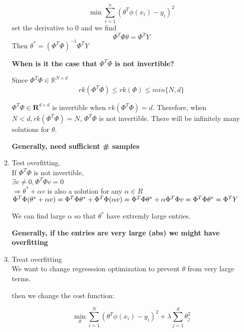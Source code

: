 \documentclass[12pt]{article}
\newcommand{\Rb}{\mathbf{R}}
\begin{document}
\begin{multicols}{2}
\begin{enumerate}
            $$\min \sum_{i = 1}^n (\theta^T \phi(x_i) - y_i)^2$$ set the derivative to 0 and we find $$\Phi^T \Phi \theta = \Phi^T Y$$ Then $\theta^* = (\Phi^T \Phi)^{-1}\Phi^T Y$

            \textbf{When is it the case that $\Phi^T\Phi$ is not invertible?}
            
            Since $\Phi^T \Phi \in \mathbb{R}^{N\times d}$ 
            $$rk(\Phi^T \Phi) \le rk(\Phi) \le min\{N,d\}$$

            $\Phi^T \Phi \in \Rb^{d \times d}$ is invertible when $rk(\Phi^T \Phi) = d$. Therefore, when $N < d, rk(\Phi^T \Phi) = N$, $\Phi^T \Phi $ is not invertible. There will be infinitely many solutions for $\theta$.

            \textbf{Generally, need sufficient \# samples}

            \item Test overfitting.\\
            If $\Phi^T \Phi$ is not invertible,\\
            $\exists v \ne 0 , \Phi^T \Phi v = 0$\\
            $\Rightarrow \theta^* + \alpha v$ is also a solution for any $\alpha \in R$\\
            $\Phi^T \Phi (\theta^* + \alpha v) = \Phi^T \Phi \theta^* + \Phi^T \Phi (\alpha v) \\ = \Phi^T \Phi \theta^* + \alpha \Phi^T \Phi v \\ = \Phi^T \Phi \theta^* = \Phi^T Y$

            We can find large $\alpha$ so that $\theta^*$ have extremly large entries.

            \textbf{Generally, if the entries are very large (abs) we might have overfitting}

            \item Treat overfitting\\
            We want to change regreession optimization to prevent $\theta$ from very large terms.

            then we change the cost function:

            $$\min_{\theta} \sum_{i = 1}^{N}(\theta^T\phi(x_i) - y_i)^2 + \lambda \sum_{j = 1}^d \theta_j^2$$


\end{enumerate}
\end{multicols}
\end{document}
